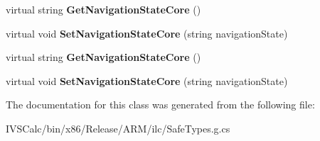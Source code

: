 \begin{DoxyCompactItemize}
\mbox{\label{class_windows_1_1_u_i_1_1_xaml_1_1_media_1_1_animation_1_1_navigation_transition_info_a58366b5ad23413ac938018890d9edf57}} 
virtual string {\bfseries Get\+Navigation\+State\+Core} ()
\item 
\mbox{\label{class_windows_1_1_u_i_1_1_xaml_1_1_media_1_1_animation_1_1_navigation_transition_info_ae93a0c66549988c2ac651776603c78dc}} 
virtual void {\bfseries Set\+Navigation\+State\+Core} (string navigation\+State)
\item 
\mbox{\label{class_windows_1_1_u_i_1_1_xaml_1_1_media_1_1_animation_1_1_navigation_transition_info_a58366b5ad23413ac938018890d9edf57}} 
virtual string {\bfseries Get\+Navigation\+State\+Core} ()
\item 
\mbox{\label{class_windows_1_1_u_i_1_1_xaml_1_1_media_1_1_animation_1_1_navigation_transition_info_ae93a0c66549988c2ac651776603c78dc}} 
virtual void {\bfseries Set\+Navigation\+State\+Core} (string navigation\+State)
\end{DoxyCompactItemize}


The documentation for this class was generated from the following file\+:\begin{DoxyCompactItemize}
\item 
I\+V\+S\+Calc/bin/x86/\+Release/\+A\+R\+M/ilc/Safe\+Types.\+g.\+cs\end{DoxyCompactItemize}
